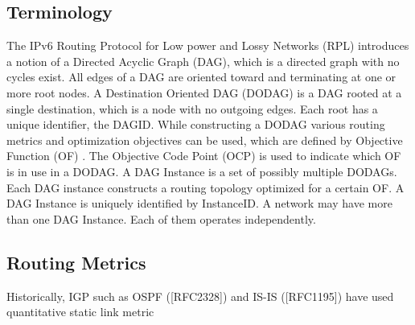 \subsection{Terminology}
The IPv6 Routing Protocol for Low power and Lossy Networks (RPL) introduces a notion of a Directed Acyclic Graph (DAG), which is a directed graph with no cycles exist. All edges of a DAG are oriented toward and terminating at one or more root nodes. A Destination Oriented DAG (DODAG) is a DAG rooted at a single destination, which is a node with no outgoing edges.  Each root has a unique identifier, the DAGID. While constructing a DODAG various routing metrics and optimization objectives can be used, which are defined by Objective Function (OF) \cite{draft-routing-metrics-04}.  The Objective Code Point (OCP) is used to indicate which OF is in use in a DODAG. A DAG Instance is a set of possibly multiple DODAGs. Each DAG instance constructs a routing topology optimized for a certain OF. A DAG Instance is uniquely identified by InstanceID. A network may have more than one DAG Instance. Each of them operates independently. 

\subsection{Routing Metrics}
Historically, IGP such as OSPF ([RFC2328]) and IS-IS ([RFC1195]) have used quantitative static link metric

